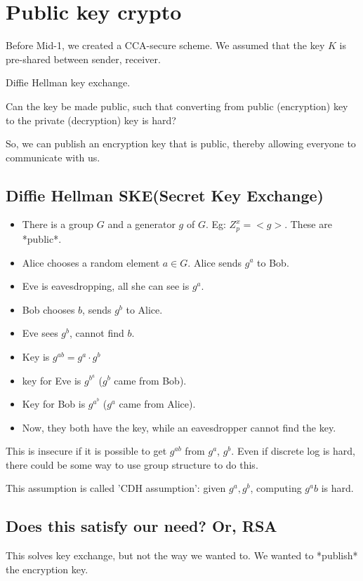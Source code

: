 \section{Public key crypto}

Before Mid-1, we created a CCA-secure scheme.
We assumed that the key $K$ is pre-shared between sender, receiver.

Diffie Hellman key exchange.


Can the key be made public, such that converting from public (encryption) key to the
private (decryption) key is hard?

So, we can publish an encryption key that is public, thereby allowing everyone to
communicate with us.


\subsection{Diffie Hellman SKE(Secret Key Exchange)}
\begin{itemize}
\item There is a group $G$ and a generator $g$ of $G$. Eg: $Z_p^x = <g>$. These are *public*.
\item Alice chooses a random element $a \in G$. Alice sends $g^a$ to Bob.
\item Eve is eavesdropping, all she can see is $g^a$.
\item Bob chooses $b$, sends $g^b$ to Alice.
\item Eve sees $g^b$, cannot find $b$.
\item Key is $g^{ab} = g^a \cdot g^b$
\item key for Eve is $g^b^a$ ($g^b$ came from Bob).
\item Key for Bob is $g^a^b$ ($g^a$ came from Alice).
\item Now, they both have the key, while an eavesdropper cannot find the key.
\end{itemize}

This is insecure if it is possible to get $g^{ab}$ from $g^a$, $g^b$. Even if discrete log is
hard, there could be some way to use group structure to do this.

This assumption is called 'CDH assumption': given $g^a, g^b$, computing $g^ab$ is hard.


\subsection{Does this satisfy our need? Or, RSA}
This solves key exchange, but not the way we wanted to. We wanted to *publish* the encryption key.

